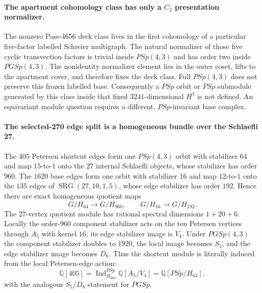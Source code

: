 \paragraph{The apartment cohomology class has only a $C_2$ presentation normalizer.}
The nonzero Pass-4656 deck class lives in the first cohomology of a particular five-factor labelled Schreier multigraph.  The natural normalizer of those five cyclic transvection factors is trivial inside $PSp(4,3)$ and has order two inside $PGSp(4,3)$.  The nonidentity normalizer element lies in the outer coset, lifts to the apartment cover, and therefore fixes the deck class.  Full $PSp(4,3)$ does not preserve this frozen labelled base.  Consequently a $PSp$ orbit or $PSp$ submodule generated by this class inside that fixed $3241$-dimensional $H^1$ is not defined.  An equivariant module question requires a different, $PSp$-invariant base complex.

\paragraph{The selected-270 edge split is a homogeneous bundle over the Schlaefli 27.}
The $405$ Petersen shortcut edges form one $PSp(4,3)$ orbit with stabilizer $64$ and map $15$-to-$1$ onto the $27$ internal Schlaefli objects, whose stabilizer has order $960$.  The $1620$ base edges form one orbit with stabilizer $16$ and map $12$-to-$1$ onto the $135$ edges of $\operatorname{SRG}(27,10,1,5)$, whose edge stabilizer has order $192$.  Hence there are exact homogeneous quotient maps
\[
G/H_{64}\longrightarrow G/H_{960},\qquad
G/H_{16}\longrightarrow G/H_{192}.
\]
The $27$-vertex quotient module has rational spectral dimensions $1+20+6$.  Locally the order-$960$ component stabilizer acts on the ten Petersen vertices through $A_5$ with kernel $16$; its edge stabilizer image is $V_4$.  Under $PGSp(4,3)$ the component stabilizer doubles to $1920$, the local image becomes $S_5$, and the edge stabilizer image becomes $D_8$.  Thus the shortcut module is literally induced from the local Petersen-edge action:
\[
\mathbb Q[405]
=\operatorname{Ind}_{H_{960}}^{PSp}\mathbb Q[A_5/V_4]
=\mathbb Q[PSp/H_{64}],
\]
with the analogous $S_5/D_8$ statement for $PGSp$.

